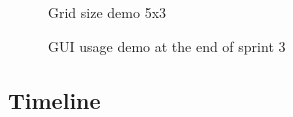 \documentclass[11pt]{article} %
\begin{document}
  \begin{figure}[H]
  	\centering
  	\caption{Grid size demo 5x3}
  	\label{fig:GUI Design 5 size demo 2}
  \end{figure} 
  
  \begin{figure}[H]
  	\centering
  	\caption{GUI usage demo at the end of sprint 3}
  	\label{fig:GUI Design 5 demo}
  \end{figure}
  
  
\newpage
\subsection{Timeline}

\end{document}
